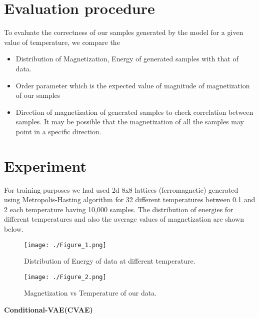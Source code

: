 \documentclass[12pt,a4paper]{article}
\begin{document}
{\section{Evaluation procedure}
To evaluate the correctness of our samples generated by the model for a given value of temperature, we compare the \begin{itemize}
    \item Distribution of Magnetization, Energy of generated samples with that of data.
    \item Order parameter which is the expected value of magnitude of magnetization of our samples
    \item Direction of magnetization of generated samples to check correlation between samples. It may be possible that the magnetization of all the samples may point in a specific direction.
\end{itemize}
\section{Experiment}
For training purposes we had used 2d 8x8 lattices (ferromagnetic) generated using Metropolis-Hasting algorithm for 32 different temperatures between 0.1 and 2 each temperature having 10,000 samples. The distribution of energies for different temperatures  and also the average values of magnetization are shown below.
\begin{figure}[H]
	\begin{Center}
		\texttt{[image: ./Figure\_1.png]}
		 \caption{Distribution of Energy of data at different temperature.}
	\end{Center}
\end{figure}
\begin{figure}[H]
	\begin{Center}
		\texttt{[image: ./Figure\_2.png]}
		 \caption{Magnetization vs Temperature of our data.}
	\end{Center}
\end{figure}

\textbf{Conditional-VAE(CVAE)}}\par
\end{document}
